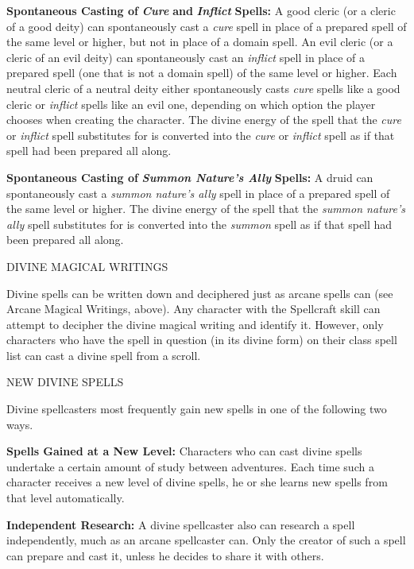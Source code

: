 \documentclass{article}
\begin{document}
\textbf{Spontaneous Casting of }\textit{\textbf{Cure }}\textbf{and }\textit{\textbf{Inflict 
}}\textbf{Spells:} A good cleric (or a cleric of a good deity) can spontaneously 
cast a \textit{cure }spell in place of a prepared spell of the same level or higher, 
but not in place of a domain spell. An evil cleric (or a cleric of an evil deity) 
can spontaneously cast an \textit{inflict }spell in place of a prepared spell (one 
that is not a domain spell) of the same level or higher. Each neutral cleric of 
a neutral deity either spontaneously casts \textit{cure }spells like a good cleric 
or \textit{inflict }spells like an evil one, depending on which option the player 
chooses when creating the character. The divine energy of the spell that the \textit{cure 
}or \textit{inflict }spell substitutes for is converted into the \textit{cure }or 
\textit{inflict }spell as if that spell had been prepared all along.

\textbf{Spontaneous Casting of }\textit{\textbf{Summon Nature's Ally }}\textbf{Spells:} 
A druid can spontaneously cast a \textit{summon nature's ally }spell in place of 
a prepared spell of the same level or higher. The divine energy of the spell that 
the \textit{summon nature's ally }spell substitutes for is converted into the \textit{summon 
}spell as if that spell had been prepared all along.

\vspace{12pt}
DIVINE MAGICAL WRITINGS

Divine spells can be written down and deciphered just as arcane spells can (see 
Arcane Magical Writings, above). Any character with the Spellcraft skill can attempt 
to decipher the divine magical writing and identify it. However, only characters 
who have the spell in question (in its divine form) on their class spell list can 
cast a divine spell from a scroll.

\vspace{12pt}
NEW DIVINE SPELLS

Divine spellcasters most frequently gain new spells in one of the following two 
ways.

\textbf{Spells Gained at a New Level: }Characters who can cast divine spells undertake 
a certain amount of study between adventures. Each time such a character receives 
a new level of divine spells, he or she learns new spells from that level automatically.

\textbf{Independent Research:} A divine spellcaster also can research a spell independently, 
much as an arcane spellcaster can. Only the creator of such a spell can prepare 
and cast it, unless he decides to share it with others.
\end{document}
